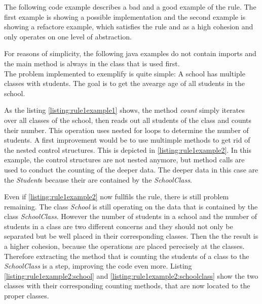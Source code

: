 The following code example describes a bad and a good example of the rule. The first example is showing a possible implementation and the second example is showing a refactore example, which satisfies the rule and as a high cohesion and only operates on one level of abstraction. 

For reasons of simplicity, the following java examples do not contain imports and the main method is always in the class that is used first. 
\\
The problem implemented to exemplify is quite simple: A school has multiple classes with students. The goal is to get the avearge age of all students in the school. 


\label{listing:rule1example1}

As the listing \ref{listing:rule1example1} shows, the method \textit{count} simply iterates over all classes of the school, then reads out all students of the class and counts their number. This operation uses nested for loops to determine the number of students. A first improvement would be to use multimple methods to get rid of the nested control structures. This is depicted in \ref{listing:rule1example2}. In this example, the control structures are not nested anymore, but method calls are used to conduct the counting of the deeper data. The deeper data in this case are the \textit{Student}s because their are contained by the \textit{SchoolClass}. 


\label{listing:rule1example2}

Even if \ref{listing:rule1example2} now fullfils the rule, there is still problem remaining. The class \textit{School} is still operating on the data that is contained by the class \textit{SchoolClass}. However the number of students in a school and the number of students in a class are two different concerns and they should not only be separated but be well placed in their corresponding classes. Then the the result is a higher cohesion, because the operations are placed perecisely at the classes. Therefore extracting the method that is counting the students of a class to the \textit{SchoolClass} is a step, improving the code even more. Listing \ref{listing:rule1example2:school} and \ref{listing:rule1example2:schoolclass} show the two classes with their corresponding counting methods, that are now located to the proper classes. 


\label{listing:rule1example3:school}

\label{listing:rule1example3:schoolclass}
\\

